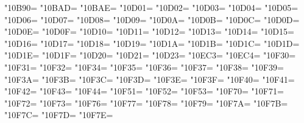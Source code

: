 \XeTeXcharclass"10B90=\KclassArabD
\XeTeXcharclass"10BAD=\KclassArabD
\XeTeXcharclass"10BAE=\KclassArabD
\XeTeXcharclass"10D01=\KclassArabD
\XeTeXcharclass"10D02=\KclassArabD
\XeTeXcharclass"10D03=\KclassArabD
\XeTeXcharclass"10D04=\KclassArabD
\XeTeXcharclass"10D05=\KclassArabD
\XeTeXcharclass"10D06=\KclassArabD
\XeTeXcharclass"10D07=\KclassArabD
\XeTeXcharclass"10D08=\KclassArabD
\XeTeXcharclass"10D09=\KclassArabD
\XeTeXcharclass"10D0A=\KclassArabD
\XeTeXcharclass"10D0B=\KclassArabD
\XeTeXcharclass"10D0C=\KclassArabD
\XeTeXcharclass"10D0D=\KclassArabD
\XeTeXcharclass"10D0E=\KclassArabD
\XeTeXcharclass"10D0F=\KclassArabD
\XeTeXcharclass"10D10=\KclassArabD
\XeTeXcharclass"10D11=\KclassArabD
\XeTeXcharclass"10D12=\KclassArabD
\XeTeXcharclass"10D13=\KclassArabD
\XeTeXcharclass"10D14=\KclassArabD
\XeTeXcharclass"10D15=\KclassArabD
\XeTeXcharclass"10D16=\KclassArabD
\XeTeXcharclass"10D17=\KclassArabD
\XeTeXcharclass"10D18=\KclassArabD
\XeTeXcharclass"10D19=\KclassArabD
\XeTeXcharclass"10D1A=\KclassArabD
\XeTeXcharclass"10D1B=\KclassArabD
\XeTeXcharclass"10D1C=\KclassArabD
\XeTeXcharclass"10D1D=\KclassArabD
\XeTeXcharclass"10D1E=\KclassArabD
\XeTeXcharclass"10D1F=\KclassArabD
\XeTeXcharclass"10D20=\KclassArabD
\XeTeXcharclass"10D21=\KclassArabD
\XeTeXcharclass"10D23=\KclassArabD
\XeTeXcharclass"10EC3=\KclassArabD
\XeTeXcharclass"10EC4=\KclassArabD
\XeTeXcharclass"10F30=\KclassArabD
\XeTeXcharclass"10F31=\KclassArabD
\XeTeXcharclass"10F32=\KclassArabD
\XeTeXcharclass"10F34=\KclassArabD
\XeTeXcharclass"10F35=\KclassArabD
\XeTeXcharclass"10F36=\KclassArabD
\XeTeXcharclass"10F37=\KclassArabD
\XeTeXcharclass"10F38=\KclassArabD
\XeTeXcharclass"10F39=\KclassArabD
\XeTeXcharclass"10F3A=\KclassArabD
\XeTeXcharclass"10F3B=\KclassArabD
\XeTeXcharclass"10F3C=\KclassArabD
\XeTeXcharclass"10F3D=\KclassArabD
\XeTeXcharclass"10F3E=\KclassArabD
\XeTeXcharclass"10F3F=\KclassArabD
\XeTeXcharclass"10F40=\KclassArabD
\XeTeXcharclass"10F41=\KclassArabD
\XeTeXcharclass"10F42=\KclassArabD
\XeTeXcharclass"10F43=\KclassArabD
\XeTeXcharclass"10F44=\KclassArabD
\XeTeXcharclass"10F51=\KclassArabD
\XeTeXcharclass"10F52=\KclassArabD
\XeTeXcharclass"10F53=\KclassArabD
\XeTeXcharclass"10F70=\KclassArabD
\XeTeXcharclass"10F71=\KclassArabD
\XeTeXcharclass"10F72=\KclassArabD
\XeTeXcharclass"10F73=\KclassArabD
\XeTeXcharclass"10F76=\KclassArabD
\XeTeXcharclass"10F77=\KclassArabD
\XeTeXcharclass"10F78=\KclassArabD
\XeTeXcharclass"10F79=\KclassArabD
\XeTeXcharclass"10F7A=\KclassArabD
\XeTeXcharclass"10F7B=\KclassArabD
\XeTeXcharclass"10F7C=\KclassArabD
\XeTeXcharclass"10F7D=\KclassArabD
\XeTeXcharclass"10F7E=\KclassArabD
